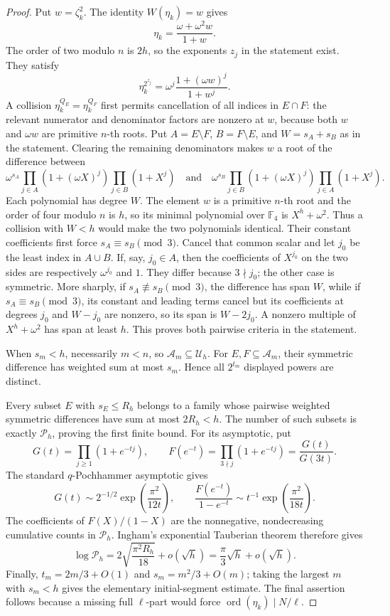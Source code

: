 \documentclass[11pt]{article}
\theoremstyle{definition}
\theoremstyle{remark}
\begin{document}
\begin{proof}
Put $w=\zeta_k^2$.  The identity $W(\eta_k)=w$ gives
\[
 \eta_k=\frac{\omega+\omega^2w}{1+w}.
\]
The order of two modulo $n$ is $2h$, so the exponents $z_j$ in the statement
exist.  They satisfy
\[
 \eta_k^{2^{z_j}}
 =\omega^j\frac{1+(\omega w)^j}{1+w^j}.
\]
A collision $\eta_k^{Q_E}=\eta_k^{Q_F}$ first permits cancellation of all indices in
$E\cap F$: the relevant numerator and denominator factors are nonzero at
$w$, because both $w$ and $\omega w$ are primitive $n$-th roots.  Put
$A=E\setminus F$, $B=F\setminus E$, and $W=s_A+s_B$ as in the statement.
Clearing the remaining
denominators makes $w$ a root of the difference between
\[
 \omega^{s_A}
 \prod_{j\in A}(1+(\omega X)^j)\prod_{j\in B}(1+X^j)
 \quad\text{and}\quad
 \omega^{s_B}
 \prod_{j\in B}(1+(\omega X)^j)\prod_{j\in A}(1+X^j).
\]
Each polynomial has degree $W$.  The element $w$ is a
primitive $n$-th root and the order of four modulo $n$ is $h$, so its minimal
polynomial over $\mathbb F_4$ is $X^h+\omega^2$.  Thus a collision with
$W<h$ would make the two polynomials identical.  Their constant coefficients
first force $s_A\equiv s_B\pmod3$.  Cancel that common scalar and let $j_0$
be the least index in $A\cup B$.  If, say, $j_0\in A$, then the coefficients
of $X^{j_0}$ on the two
sides are respectively $\omega^{j_0}$ and $1$.  They differ because
$3\nmid j_0$; the other case is symmetric.  More sharply, if
$s_A\not\equiv s_B\pmod3$, the
difference has span $W$, while if $s_A\equiv s_B\pmod3$, its constant and
leading terms cancel but its coefficients at degrees $j_0$ and $W-j_0$ are
nonzero, so its span is $W-2j_0$.  A nonzero multiple of $X^h+\omega^2$ has
span at least $h$.  This proves both pairwise criteria in the statement.

When $s_m<h$, necessarily $m<n$, so $\mathcal A_m\subseteq\mathcal U_h$.
For $E,F\subseteq\mathcal A_m$, their symmetric difference has weighted sum
at most $s_m$.  Hence all $2^{t_m}$ displayed powers are distinct.

Every subset $E$ with $s_E\leq R_h$ belongs to a family whose pairwise
weighted symmetric differences have sum at most $2R_h<h$.  The number of
such subsets is exactly $\mathcal P_h$, proving the first finite bound.  For
its asymptotic, put
\[
 G(t)=\prod_{j\geq1}(1+e^{-tj}),\qquad
 F(e^{-t})=\prod_{3\nmid j}(1+e^{-tj})=\frac{G(t)}{G(3t)}.
\]
The standard $q$-Pochhammer asymptotic gives
\[
 G(t)\sim2^{-1/2}\exp\!\left(\frac{\pi^2}{12t}\right),
 \qquad
 \frac{F(e^{-t})}{1-e^{-t}}
 \sim t^{-1}\exp\!\left(\frac{\pi^2}{18t}\right).
\]
The coefficients of $F(X)/(1-X)$ are the nonnegative, nondecreasing
cumulative counts in $\mathcal P_h$.  Ingham's exponential Tauberian theorem
\cite{ingham1941} therefore gives
\[
 \log\mathcal P_h
 =2\sqrt{\frac{\pi^2R_h}{18}}+o(\sqrt h)
 =\frac\pi3\sqrt h+o(\sqrt h).
\]
Finally, $t_m=2m/3+O(1)$ and $s_m=m^2/3+O(m)$; taking the largest $m$ with
$s_m<h$ gives the elementary initial-segment estimate.  The final assertion
follows because a missing full $\ell$-part would force
$\operatorname{ord}(\eta_k)\mid N/\ell$.
\end{proof}
\end{document}

